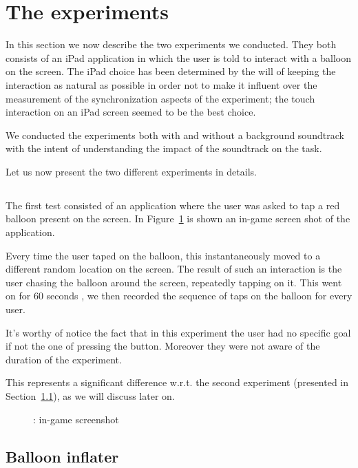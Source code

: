 \section{The experiments}
In this section we now describe the two experiments we conducted. They both consists of an iPad application in which the user is told to interact with a balloon on the screen. The iPad choice has been determined by the will of keeping the interaction as natural as possible in order not to make it influent over the measurement of the synchronization aspects of the experiment; the touch interaction on an iPad screen seemed to be the best choice.

We conducted the experiments both with and without a background soundtrack with the intent of understanding the impact of the soundtrack on the task.

Let us now present the two different experiments in details.

\subsection{\testfirst}
\label{sec:test1}
The first test consisted of an application where the user was asked to tap a red balloon present on the screen. In Figure~\ref{fig:test1} is shown an in-game screen shot of the application.

Every time the user taped on the balloon, this instantaneously moved to a different random location on the screen. The result of such an interaction is the user chasing the balloon around the screen, repeatedly tapping on it. This went on for 60 seconds , we then recorded the sequence of taps on the balloon for every user.

It's worthy of notice the fact that in this experiment the user had no specific goal if not the one of pressing the button. Moreover they were not aware of the duration of the experiment.

This represents a significant difference w.r.t. the second experiment (presented in Section~\ref{sec:test1}), as we will discuss later on.

\begin{figure}[h!t]
\label{fig:test1}
\centering
	{\setlength{\fboxsep}{0pt}
	 }
\caption{\testfirst: in-game screenshot}
\end{figure}

\subsection{Balloon inflater}
\label{sec:test2}
\lipsum[7-15]